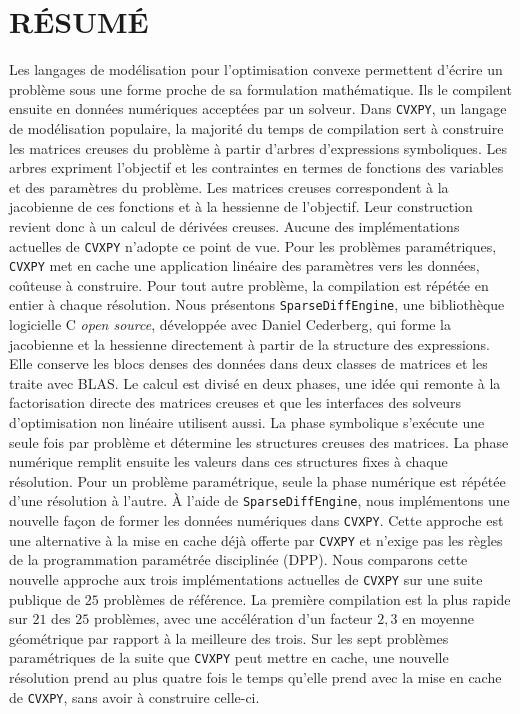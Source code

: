 %
\chapter*{RÉSUMÉ}\thispagestyle{headings}

Les langages de modélisation pour l'optimisation convexe permettent d'écrire un problème sous une
forme proche de sa formulation mathématique. Ils le compilent ensuite en données numériques
acceptées par un solveur. Dans \texttt{CVXPY}, un langage de modélisation populaire, la
majorité du temps
de compilation sert à construire les matrices creuses du problème à partir d'arbres d'expressions
symboliques. Les arbres expriment l'objectif et les contraintes en termes de fonctions des
variables et des paramètres du problème. Les matrices creuses correspondent à la jacobienne de
ces fonctions et à la hessienne de
l'objectif. Leur construction revient donc à un calcul de dérivées creuses. Aucune des
implémentations actuelles de \texttt{CVXPY} n'adopte ce point de vue. Pour les problèmes
paramétriques,
\texttt{CVXPY} met en cache une application linéaire des paramètres vers les données, coûteuse à
construire. Pour tout autre problème, la
compilation est répétée en entier à chaque résolution. Nous présentons
\texttt{SparseDiffEngine}, une bibliothèque logicielle C \emph{open source}, développée avec Daniel Cederberg, qui forme la jacobienne et la
hessienne directement à partir de la structure des expressions. Elle conserve les blocs denses
des données dans deux classes de matrices et les traite avec BLAS. Le calcul est divisé en deux
phases, une idée qui remonte à la factorisation directe des matrices creuses et que les
interfaces des solveurs d'optimisation non linéaire utilisent aussi.
La phase symbolique s'exécute une seule fois par problème et détermine les structures
creuses des matrices. La phase numérique remplit ensuite les valeurs dans ces structures fixes à
chaque résolution. Pour un problème paramétrique, seule la phase numérique est répétée d'une
résolution à l'autre. À l'aide de \texttt{SparseDiffEngine}, nous implémentons une nouvelle façon
de former les données numériques dans \texttt{CVXPY}. Cette approche est une alternative à la mise
en cache déjà offerte par \texttt{CVXPY} et n'exige pas les règles
de la programmation paramétrée disciplinée (DPP). Nous comparons cette nouvelle approche aux trois implémentations
actuelles de \texttt{CVXPY} sur une suite publique de $25$ problèmes de référence. La première
compilation est la plus rapide sur $21$ des $25$ problèmes, avec une accélération d'un facteur
$2{,}3$ en moyenne géométrique par rapport à la meilleure des trois. Sur les sept problèmes
paramétriques de la suite que \texttt{CVXPY} peut mettre en cache, une nouvelle résolution
prend au plus quatre fois le temps qu'elle prend avec la mise en cache de
\texttt{CVXPY}, sans avoir à construire celle-ci.
